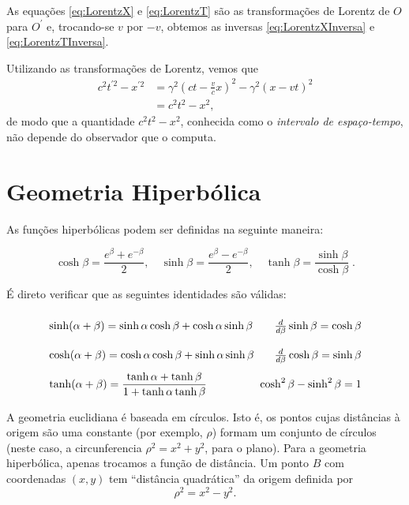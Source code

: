 As equações \eqref{eq:LorentzX} e \eqref{eq:LorentzT} são as transformações de Lorentz de $O$ para $O^\prime$ e, trocando-se $v$ por $-v$, obtemos as inversas \eqref{eq:LorentzXInversa} e \eqref{eq:LorentzTInversa}.

Utilizando as transformações de Lorentz, vemos que
\begin{equation}\label{eq:Intervalo}
\begin{aligned} c^{2} t^{\prime 2} -x^{\prime2} &=\gamma^{2}\left(c t-\frac{v}{c} x\right)^{2}-\gamma^{2}(x-v t)^{2} \\ &=c^{2} t^{2}-x^{2} ,\end{aligned}
\end{equation}
de modo que a quantidade $c^2t^2-x^2$, conhecida como o \textit{intervalo de espaço-tempo}, não depende do observador que o computa.

\section{Geometria Hiperbólica}\label{sec:GeometriaHiperbolica}

As funções hiperbólicas podem ser definidas na seguinte maneira:

\begin{equation}\label{eq:FuncoesHiperbolicas}
 \cosh \beta =\frac{e^{\beta}+e^{-\beta}}{2}, \quad \sinh \beta =\frac{e^{\beta}-e^{-\beta}}{2}, \quad \tanh \beta =\frac{\sinh \beta}{\cosh \beta } \; .
\end{equation}

É direto verificar que as seguintes identidades são válidas:
\begin{equation}\label{eq:IdentidadesFuncoesHiperbolicas}
\arraycolsep=1.4pt\def\arraystretch{2.2}
\begin{array}{lr}
{\sinh (\alpha+\beta)=\sinh \alpha \cosh \beta+\cosh \alpha \sinh \beta \;} & {\frac{d}{d \beta} \sinh \beta=\cosh \beta} \\
{\cosh (\alpha+\beta)=\cosh \alpha \cosh \beta+\sinh \alpha \sinh \beta \;} & {\frac{d}{d \beta} \cosh \beta=\sinh \beta} \\
{\tanh (\alpha+\beta)=\dfrac{\tanh \alpha+\tanh \beta}{1+\tanh \alpha \tanh \beta}} & {\cosh ^{2} \beta-\sinh ^{2} \beta=1  }
\end{array}
\end{equation}

A geometria euclidiana é baseada em círculos. Isto é, os pontos cujas distâncias à origem são uma constante (por exemplo, $\rho$) formam um conjunto de círculos (neste caso, a circunferencia $\rho^2=x^2+y^2$, para o plano). Para a geometria hiperbólica, apenas trocamos a função de distância. Um ponto $B$ com coordenadas $(x,y)$ tem ``distância quadrática'' da origem definida por
\begin{equation}\label{eq:DistanciaHiperbolica}
    \rho^2=x^2-y^2 .
\end{equation}

